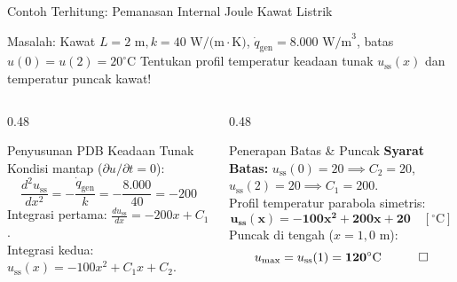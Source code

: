 \documentclass[aspectratio=169,10pt]{beamer}
\begin{document}
\begin{frame}{Contoh Terhitung: Pemanasan Internal Joule Kawat Listrik}
  \begin{exampleblock}{Masalah: Kawat $L = 2\text{ m}, k = 40\text{ W/(m}\cdot\text{K)}$, $\dot{q}_{\text{gen}} = 8.000\text{ W/m}^3$, batas $u(0)=u(2)=20^\circ\text{C}$}
    Tentukan profil temperatur keadaan tunak $u_{\text{ss}}(x)$ dan temperatur puncak kawat!
  \end{exampleblock}
  \begin{columns}[t]
    \begin{column}{0.48\textwidth}
      \begin{block}{Penyusunan PDB Keadaan Tunak}
        \small
        Kondisi mantap ($\partial u/\partial t = 0$):
        \begin{equation*}
          \frac{d^2 u_{\text{ss}}}{dx^2} = -\frac{\dot{q}_{\text{gen}}}{k} = -\frac{8.000}{40} = -200
        \end{equation*}
        Integrasi pertama: $\frac{d u_{\text{ss}}}{dx} = -200 x + C_1$.\\[2pt]
        Integrasi kedua: $u_{\text{ss}}(x) = -100 x^2 + C_1 x + C_2$.
      \end{block}
    \end{column}
    \begin{column}{0.48\textwidth}
      \begin{alertblock}{Penerapan Batas \& Puncak}
        \small
        \textbf{Syarat Batas:}
        $u_{\text{ss}}(0) = 20 \implies C_2 = 20$,\\
        $u_{\text{ss}}(2) = 20 \implies C_1 = 200$.\\[2pt]
        Profil temperatur parabola simetris:
        \begin{equation*}
          \mathbf{u_{\text{ss}}(x) = -100 x^2 + 200 x + 20} \quad [^\circ\text{C}]
        \end{equation*}
        Puncak di tengah ($x = 1{,}0\text{ m}$):
        \begin{equation*}
          u_{\text{max}} = u_{\text{ss}}(1) = \mathbf{120^\circ\text{C}} \quad \qed
        \end{equation*}
      \end{alertblock}
    \end{column}
  \end{columns}
\end{frame}
\end{document}
